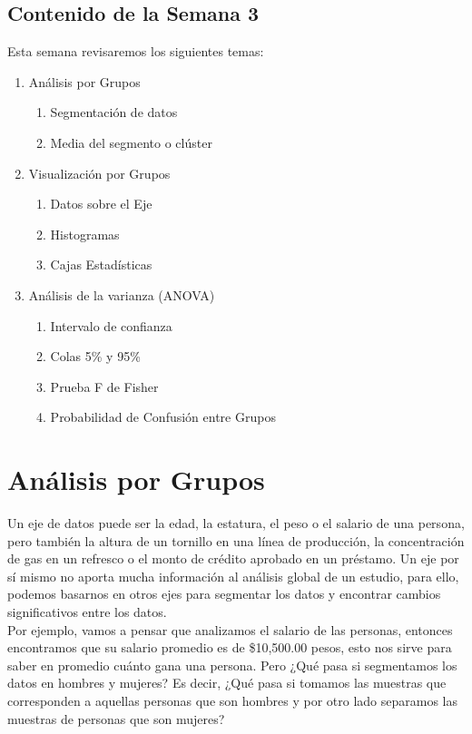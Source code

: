 \documentclass{article}
\begin{document}
\clearpage



\subsection{Contenido de la Semana 3}

Esta semana revisaremos los siguientes temas:

\begin{enumerate}
    \item Análisis por Grupos
    \begin{enumerate}
        \item Segmentación de datos
        \item Media del segmento o clúster
    \end{enumerate}
    \item Visualización por Grupos
    \begin{enumerate}
        \item Datos sobre el Eje
        \item Histogramas
        \item Cajas Estadísticas
    \end{enumerate}
    \item Análisis de la varianza (ANOVA)
    \begin{enumerate}
        \item Intervalo de confianza
        \item Colas 5\% y 95\%
        \item Prueba F de Fisher
        \item Probabilidad de Confusión entre Grupos
    \end{enumerate}
\end{enumerate}

\section{Análisis por Grupos}

Un eje de datos puede ser la edad, la estatura, el peso o el salario de una persona, pero también la altura de un tornillo en una línea de producción, la concentración de gas en un refresco o el monto de crédito aprobado en un préstamo. Un eje por sí mismo no aporta mucha información al análisis global de un estudio, para ello, podemos basarnos en otros ejes para segmentar los datos y encontrar cambios significativos entre los datos.
\\[12pt]
Por ejemplo, vamos a pensar que analizamos el salario de las personas, entonces encontramos que su salario promedio es de \$10,500.00 pesos, esto nos sirve para saber en promedio cuánto gana una persona. Pero ¿Qué pasa si segmentamos los datos en hombres y mujeres? Es decir, ¿Qué pasa si tomamos las muestras que corresponden a aquellas personas que son hombres y por otro lado separamos las muestras de personas que son mujeres?
\end{document}
